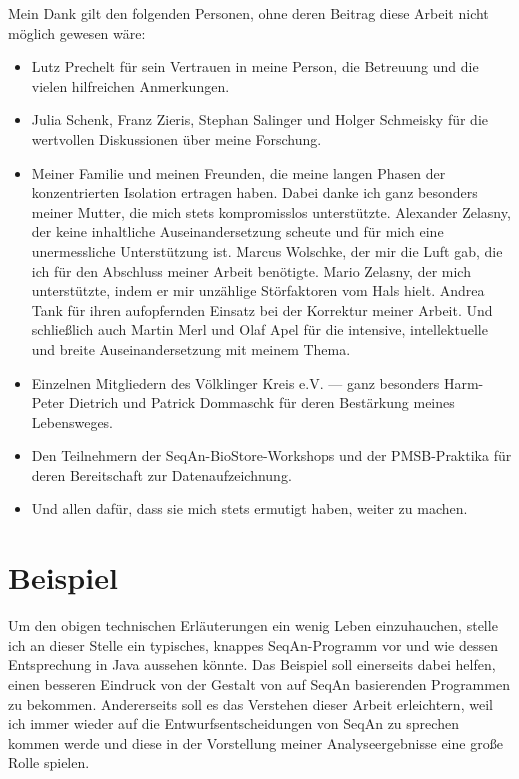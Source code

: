 \documentclass[11pt,a4paper]{book}
\let\\\space
\begin{document}
Mein Dank gilt den folgenden Personen, ohne deren Beitrag diese Arbeit nicht möglich gewesen wäre:
\begin{itemize}
  \item Lutz Prechelt für sein Vertrauen in meine Person, die Betreuung und die vielen hilfreichen Anmerkungen.
  \item Julia Schenk, Franz Zieris, Stephan Salinger und Holger Schmeisky für die wertvollen Diskussionen über
meine Forschung.
  \item Meiner Familie und meinen Freunden, die meine langen Phasen der konzentrierten Isolation ertragen haben.
  \\ \\ Dabei danke ich ganz besonders meiner Mutter, die mich stets kompromisslos unterstützte. Alexander Zelasny, der keine inhaltliche Auseinandersetzung scheute und für mich eine unermessliche Unterstützung ist. Marcus Wolschke, der mir die Luft gab, die ich für den Abschluss meiner Arbeit benötigte. Mario Zelasny, der mich unterstützte, indem er mir unzählige Störfaktoren vom Hals hielt. Andrea Tank für ihren aufopfernden Einsatz bei der Korrektur meiner Arbeit. Und schließlich auch Martin Merl und Olaf Apel für die intensive, intellektuelle und breite Auseinandersetzung mit meinem Thema.
  \item Einzelnen Mitgliedern des Völklinger Kreis e.V. --- ganz besonders Harm-Peter Dietrich und Patrick Dommaschk für deren Bestärkung meines Lebensweges.
  \item Den Teilnehmern der SeqAn-BioStore-Workshops und der PMSB-Praktika für deren Bereitschaft zur Datenaufzeichnung.
  \item Und allen dafür, dass sie mich stets ermutigt haben, weiter zu machen.
\end{itemize}

\section{Beispiel}

Um den obigen technischen Erläuterungen ein wenig Leben einzuhauchen, stelle ich an dieser Stelle ein typisches, knappes SeqAn-Programm vor und wie dessen Entsprechung in Java aussehen könnte. Das Beispiel soll einerseits dabei helfen, einen besseren Eindruck von der Gestalt von auf SeqAn basierenden Programmen zu bekommen. Andererseits soll es das Verstehen dieser Arbeit erleichtern, weil ich immer wieder auf die Entwurfsentscheidungen von SeqAn zu sprechen kommen werde und diese in der Vorstellung meiner Analyseergebnisse eine große Rolle spielen.
\end{document}
